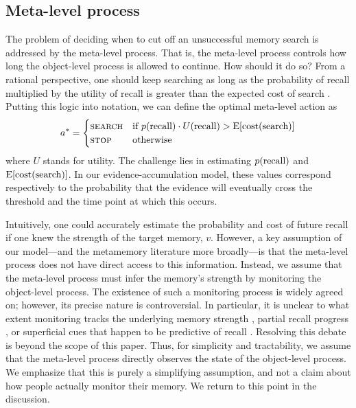 

\subsection{Meta-level process}
The problem of deciding when to cut off an unsuccessful memory search is addressed by the meta-level process. That is, the meta-level process controls how long the object-level process is allowed to continue. How should it do so? From a rational perspective, one should keep searching as long as the probability of recall multiplied by the utility of recall is greater than the expected cost of search \citep{anderson1989human}. Putting this logic into notation, we can define the optimal meta-level action as
%
\begin{equation}\label{eq:anderson}
  a^* = \begin{cases}
    \textsc{search} & \text{if } p({\text{recall}}) \cdot U({\text{recall}}) > \operatorname*{E} [\text{cost}(\text{search})] \\
    \textsc{stop} & \text{otherwise}
  \end{cases}
\end{equation}
%
where $U$ stands for utility. The challenge lies in estimating $p({\text{recall}})$ and $\operatorname*{E}[\text{cost}(\text{search})]$. In our evidence-accumulation model, these values correspond respectively to the probability that the evidence will eventually cross the threshold and the time point at which this occurs. 

Intuitively, one could accurately estimate the probability and cost of future recall if one knew the strength of the target memory, $v$. However, a key assumption of our model---and the metamemory literature more broadly---is that the meta-level process does not have direct access to this information. Instead, we assume that the meta-level process must infer the memory's strength by monitoring the object-level process. The existence of such a monitoring process is widely agreed on; however, its precise nature is controversial. In particular, it is unclear to what extent monitoring tracks the underlying memory strength \citep{hart1965memory}, partial recall progress \citep{koriat1993how}, or superficial cues that happen to be predictive of recall \citep{reder1992determines,schwartz1992cue}. Resolving this debate is beyond the scope of this paper. Thus, for simplicity and tractability, we assume that the meta-level process directly observes the state of the object-level process. We emphasize that this is purely a simplifying assumption, and not a claim about how people actually monitor their memory. We return to this point in the discussion.

